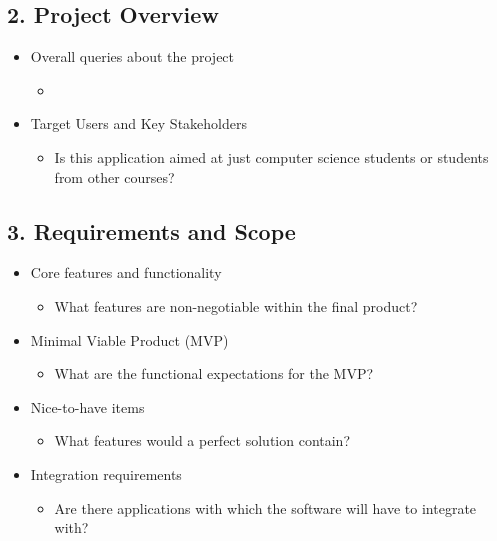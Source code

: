 \documentclass[11pt,a4paper]{article}
\begin{document}
\vspace{2em}

\subsection*{2. Project Overview \hfill}
\begin{itemize}[leftmargin=*]
    \item Overall queries about the project
    \begin{itemize}
        \item 
    \end{itemize}
    \item Target Users and Key Stakeholders
    \begin{itemize}
        \item Is this application aimed at just computer science students or students from other courses?
    \end{itemize}
\end{itemize}

\vspace{2em}

\subsection*{3. Requirements and Scope \hfill}
\begin{itemize}[leftmargin=*]
    \item Core features and functionality
    \begin{itemize}
        \item What features are non-negotiable within the final product?
    \end{itemize}
    \item Minimal Viable Product (MVP)
    \begin{itemize}
        \item What are the functional expectations for the MVP?
    \end{itemize}
    \item Nice-to-have items
    \begin{itemize}
        \item What features would a perfect solution contain?
    \end{itemize}
    \item Integration requirements
    \begin{itemize}
        \item Are there applications with which the software will have to integrate with?
    \end{itemize}
\end{itemize}
\end{document}
